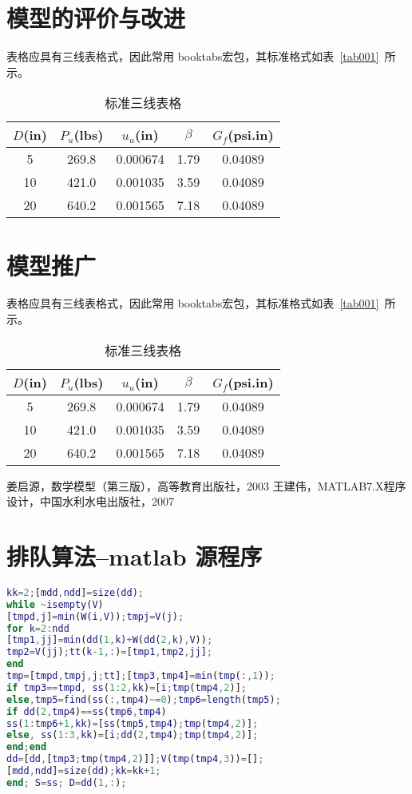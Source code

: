 \documentclass[withoutpreface,bwprint]{cumcmthesis} %
\begin{document}
\section{模型的评价与改进}

表格应具有三线表格式，因此常用 booktabs宏包，其标准格式如表~\ref{tab001}~所示。
\begin{table}[!t]
\caption{标准三线表格} \centering
\begin{tabular}{ccccc}
\toprule[1.5pt]
\label{my_table1}
$D$(in) & $P_u$(lbs) & $u_u$(in) & $\beta$ & $G_f$(psi.in)\\
\midrule[1pt]
 5 & 269.8 & 0.000674 & 1.79 & 0.04089\\
10 & 421.0 & 0.001035 & 3.59 & 0.04089\\
20 & 640.2 & 0.001565 & 7.18 & 0.04089\\
\bottomrule[1.5pt]
\end{tabular}
\end{table}


\section{模型推广}

表格应具有三线表格式，因此常用 booktabs宏包，其标准格式如表~\ref{tab001}~所示。
\begin{table}[!htbp]
\caption{标准三线表格} \centering
\begin{tabular}{ccccc}
\toprule[1.5pt]
\label{my_table1}
$D$(in) & $P_u$(lbs) & $u_u$(in) & $\beta$ & $G_f$(psi.in)\\
\midrule[1pt]
 5 & 269.8 & 0.000674 & 1.79 & 0.04089\\
10 & 421.0 & 0.001035 & 3.59 & 0.04089\\
20 & 640.2 & 0.001565 & 7.18 & 0.04089\\
\bottomrule[1.5pt]
\end{tabular}
\end{table}


\begin{thebibliography}{9}%
  姜启源，数学模型（第三版），高等教育出版社，2003
  王建伟，MATLAB7.X程序设计，中国水利水电出版社，2007
\end{thebibliography}

\newpage
\appendix
\section{排队算法--matlab 源程序}
\begin{lstlisting}[language=matlab]
kk=2;[mdd,ndd]=size(dd);
while ~isempty(V)
[tmpd,j]=min(W(i,V));tmpj=V(j);
for k=2:ndd
[tmp1,jj]=min(dd(1,k)+W(dd(2,k),V));
tmp2=V(jj);tt(k-1,:)=[tmp1,tmp2,jj];
end
tmp=[tmpd,tmpj,j;tt];[tmp3,tmp4]=min(tmp(:,1));
if tmp3==tmpd, ss(1:2,kk)=[i;tmp(tmp4,2)];
else,tmp5=find(ss(:,tmp4)~=0);tmp6=length(tmp5);
if dd(2,tmp4)==ss(tmp6,tmp4)
ss(1:tmp6+1,kk)=[ss(tmp5,tmp4);tmp(tmp4,2)];
else, ss(1:3,kk)=[i;dd(2,tmp4);tmp(tmp4,2)];
end;end
dd=[dd,[tmp3;tmp(tmp4,2)]];V(tmp(tmp4,3))=[];
[mdd,ndd]=size(dd);kk=kk+1;
end; S=ss; D=dd(1,:);
 \end{lstlisting}
\end{document}
